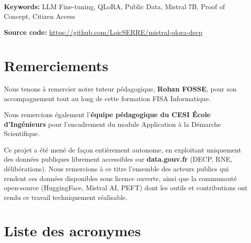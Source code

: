 \documentclass[12pt,a4paper,twoside]{report}
\begin{document}
\textbf{Keywords:} LLM Fine-tuning, QLoRA, Public Data, Mistral 7B, Proof of Concept, Citizen Access

\medskip
\noindent\textbf{Source code:} \url{https://github.com/LoicSERRE/mistral-qlora-decp}

\chapter*{Remerciements}

Nous tenons à remercier notre tuteur pédagogique, \textbf{Rohan FOSSE}, pour son accompagnement tout au long de cette formation FISA Informatique.

Nous remercions également l'\textbf{équipe pédagogique du CESI École d'Ingénieurs} pour l'encadrement du module Application à la Démarche Scientifique.

Ce projet a été mené de façon entièrement autonome, en exploitant uniquement des données publiques librement accessibles sur \textbf{data.gouv.fr} (DECP, RNE, délibérations). Nous remercions à ce titre l'ensemble des acteurs publics qui rendent ces données disponibles sous licence ouverte, ainsi que la communauté open-source (HuggingFace, Mistral AI, PEFT) dont les outils et contributions ont rendu ce travail techniquement réalisable.

\chapter*{Liste des acronymes}
\end{document}
